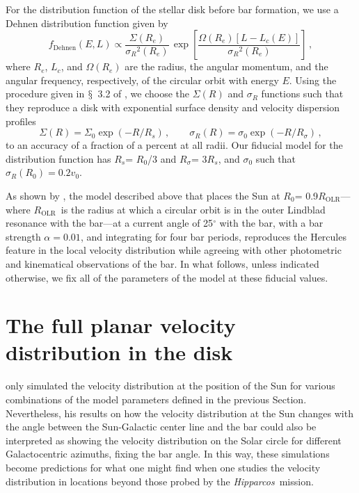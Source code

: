 \documentclass[12pt,preprint]{aastex}
\newcommand{\sectionname}{$\mathsection$}
\newcommand{\hipparcos}{\emph{Hipparcos}}
\newcommand{\vo}{\ensuremath{v_0}}
\newcommand{\Ro}{\ensuremath{R_0}}
\newcommand{\fdehnen}{\ensuremath{f_{\text{Dehnen}}}}
\newcommand{\sigmaR}{\ensuremath{\sigma_R}}
\newcommand{\rE}{\ensuremath{R_e}}
\newcommand{\Lc}{\ensuremath{L_c}}
\newcommand{\Rs}{\ensuremath{R_s}}
\newcommand{\Rsigma}{\ensuremath{R_{\sigma}}}
\newcommand{\Rolr}{\ensuremath{R_{\text{OLR}}}}
\begin{document}
For the distribution function of the stellar disk before bar
formation, we use a Dehnen distribution function \citep{dehnen99b}
given by
\begin{equation}
\fdehnen(E,L) \propto \frac{\Sigma(\rE)}{\sigmaR^2(\rE)} \, \exp\left[ \frac{\Omega(\rE)\left[L-\Lc(E)\right]}{\sigmaR^2(\rE)}\right]\,,
\end{equation}
where \rE, \Lc, and $\Omega(\rE)$ are the radius, the angular
momentum, and the angular frequency, respectively, of the circular
orbit with energy $E$. Using the procedure given in \sectionname~3.2
of \citet{dehnen99b}, we choose the $\Sigma(R)$ and $\sigmaR$
functions such that they reproduce a disk with exponential surface
density and velocity dispersion profiles 
\begin{equation}
\Sigma(R) = \Sigma_0 \exp\left(-R/\Rs\right)\,, \qquad 
\sigmaR(R) = \sigma_0 \exp\left(-R/\Rsigma\right)\,,
\end{equation}
to an accuracy of a fraction of a percent at all radii. Our fiducial
model for the distribution function has \Rs = \Ro /3 and \Rsigma =
3\Rs, and $\sigma_0$ such that $\sigmaR(\Ro) = 0.2 \vo$.

As shown by \citet{dehnen99c,dehnen00a}, the model described above
that places the Sun at \Ro = 0.9\Rolr---where \Rolr\ is the radius at
which a circular orbit is in the outer Lindblad resonance with the
bar---at a current angle of 25$^{\circ}$ with the bar, with a bar
strength $\alpha = 0.01$, and integrating for four bar periods,
reproduces the Hercules feature in the local velocity distribution
while agreeing with other photometric and kinematical observations of
the bar. In what follows, unless indicated otherwise, we fix all of
the parameters of the model at these fiducial values.




\section{The full planar velocity distribution in the disk}\label{sec:2d}

\citet{dehnen00a} only simulated the velocity distribution at the
position of the Sun for various combinations of the model parameters
defined in the previous Section. Nevertheless, his results on how the
velocity distribution at the Sun changes with the angle between the
Sun-Galactic center line and the bar could also be interpreted as
showing the velocity distribution on the Solar circle for different
Galactocentric azimuths, fixing the bar angle. In this way, these
simulations become predictions for what one might find when one
studies the velocity distribution in locations beyond those probed by
the \hipparcos\ mission.
\end{document}
